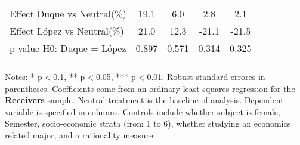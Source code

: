 \begin{table}[H]
{\begin{threeparttable}
\begin{tabular}{lccccccc}
\midrule
Effect Duque vs Neutral(\%)&        19.1         &         6.0         &         2.8         &         2.1         \\
Effect López vs Neutral(\%)&        21.0         &        12.3         &       -21.1         &       -21.5         \\
p-value H0: Duque = López&       0.897         &       0.571         &       0.314         &       0.325         \\
\bottomrule[0.5pt]                                                                               \label{tab:table2}                                                                       \end{tabular}                                                                                                    \vspace{-13pt}                                                                                           \begin{tablenotes}[flushleft]{\setlength{\itemindent}{-3pt}}          \small                                                                                                           \item Notes: * p$<$0.1, ** p$<$0.05, *** p$<$0.01. Robust standard errores in parentheses. Coefficients come from an ordinary least squares regression for the \textbf{Receivers} sample. Neutral treatment is the baseline of analysis. Dependent variable is specified in columns. Controls include whether subject is female, Semester, socio-economic strata (from 1 to 6), whether studying an economics related major, and a rationality measure.          \end{tablenotes}                                                                                         \end{threeparttable}                                                                             }                                                                                                                        \end{table}
